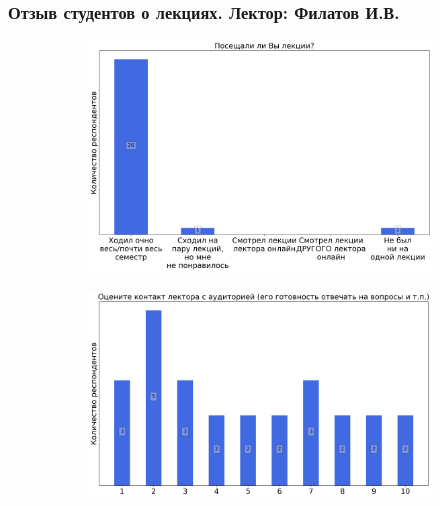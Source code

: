 	\subsubsection{Отзыв студентов о лекциях. Лектор: Филатов И.В.}

		\begin{figure}[H]
			\centering
            \begin{subfigure}[b]{0.45\textwidth}
				\centering
				\includegraphics[width=\textwidth]{images/2 course/Радиотехнические цепи и сигналы/lecturer-questions-Филатов И.В.-0.png}
			\end{subfigure}
			\begin{subfigure}[b]{0.45\textwidth}
				\centering
				\includegraphics[width=\textwidth]{images/2 course/Радиотехнические цепи и сигналы/lecturer-marks-Филатов И.В.-0.png}
			\end{subfigure}
			\begin{subfigure}[b]{0.45\textwidth}
				\centering

\end{subfigure}
\end{figure}
